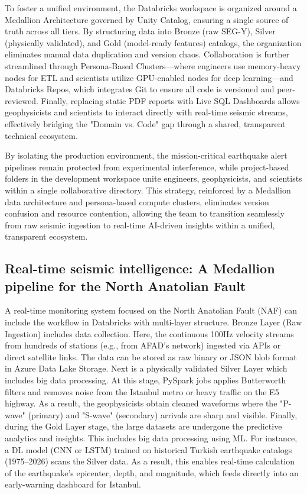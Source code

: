 \documentclass[data,article,submit,pdftex,moreauthors]{Definitions/mdpi}
\begin{document}
To foster a unified environment, the Databricks workspace is organized around a Medallion Architecture governed by Unity Catalog, ensuring a single source of truth across all tiers. By structuring data into Bronze (raw SEG-Y), Silver (physically validated), and Gold (model-ready features) catalogs, the organization eliminates manual data duplication and version chaos. Collaboration is further streamlined through Persona-Based Clusters—where engineers use memory-heavy nodes for ETL and scientists utilize GPU-enabled nodes for deep learning—and Databricks Repos, which integrates Git to ensure all code is versioned and peer-reviewed. Finally, replacing static PDF reports with Live SQL Dashboards allows geophysicists and scientists to interact directly with real-time seismic streams, effectively bridging the "Domain vs. Code" gap through a shared, transparent technical ecosystem.

By isolating the production environment, the mission-critical earthquake alert pipelines remain protected from experimental interference, while project-based folders in the development workspace unite engineers, geophysicists, and scientists within a single collaborative directory. This strategy, reinforced by a Medallion data architecture and persona-based compute clusters, eliminates version confusion and resource contention, allowing the team to transition seamlessly from raw seismic ingestion to real-time AI-driven insights within a unified, transparent ecosystem.

\subsection{Real-time seismic intelligence: A Medallion pipeline for the North Anatolian Fault}
A real-time monitoring system focused on the North Anatolian Fault (NAF) can include the workflow in Databricks with multi-layer structure.  Bronze Layer (Raw Ingestion) includes data collection. Here, the continuous 100Hz velocity streams from hundreds of stations (e.g., from AFAD’s network) ingested via APIs or direct satellite links. The data can be stored as raw binary or JSON blob format in Azure Data Lake Storage. Next is a physically validated Silver Layer which includes big data processing. At this stage, PySpark jobs applies Butterworth filters and removes noise from the Istanbul metro or heavy traffic on the E5 highway. As a result, the geophysicists obtain cleaned waveforms where the "P-wave" (primary) and "S-wave" (secondary) arrivals are sharp and visible. Finally, during the Gold Layer stage, the large datasets are undergone the predictive analytics and insights. This includes big data processing using ML. For instance, a DL model (CNN or LSTM) trained on historical Turkish earthquake catalogs (1975–2026) scans the Silver data. As a result, this enables real-time calculation of the earthquake’s epicenter, depth, and magnitude, which feeds directly into an early-warning dashboard for Istanbul.
\end{document}
